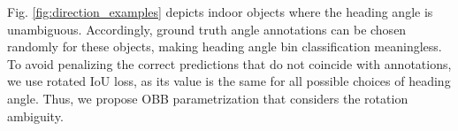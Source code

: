 \documentclass[runningheads]{llncs}
\begin{document}

Fig. \ref{fig:direction_examples} depicts indoor objects where the heading angle is unambiguous. Accordingly, ground truth angle annotations can be chosen randomly for these objects, making heading angle bin classification meaningless. To avoid penalizing the correct predictions that do not coincide with annotations, we use rotated IoU loss, as its value is the same for all possible choices of heading angle. Thus, we propose OBB parametrization that considers the rotation ambiguity.  
\end{document}
